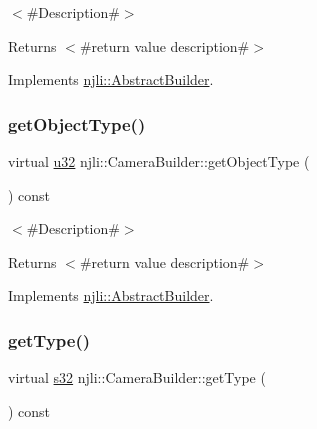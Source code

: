 $<$\#\+Description\#$>$

\begin{DoxyReturn}{Returns}
$<$\#return value description\#$>$ 
\end{DoxyReturn}


Implements \mbox{\hyperlink{classnjli_1_1_abstract_builder_a902f73ea78031b06aca183a417f3413b}{njli\+::\+Abstract\+Builder}}.

\mbox{\label{classnjli_1_1_camera_builder_a062d43db7288f55f60543b00c4f6a0ea}} 
\subsubsection{\texorpdfstring{get\+Object\+Type()}{getObjectType()}}
{\footnotesize\ttfamily virtual \mbox{\hyperlink{_util_8h_a10e94b422ef0c20dcdec20d31a1f5049}{u32}} njli\+::\+Camera\+Builder\+::get\+Object\+Type (\begin{DoxyParamCaption}{ }\end{DoxyParamCaption}) const\hspace{0.3cm}{\ttfamily [virtual]}}

$<$\#\+Description\#$>$

\begin{DoxyReturn}{Returns}
$<$\#return value description\#$>$ 
\end{DoxyReturn}


Implements \mbox{\hyperlink{classnjli_1_1_abstract_builder_a0f2d344fcf697b167f4f2b1122b5fb33}{njli\+::\+Abstract\+Builder}}.

\mbox{\label{classnjli_1_1_camera_builder_a279d8b7ec01bdb710c8e6d4683dda0c4}} 
\subsubsection{\texorpdfstring{get\+Type()}{getType()}}
{\footnotesize\ttfamily virtual \mbox{\hyperlink{_util_8h_aa62c75d314a0d1f37f79c4b73b2292e2}{s32}} njli\+::\+Camera\+Builder\+::get\+Type (\begin{DoxyParamCaption}{ }\end{DoxyParamCaption}) const\hspace{0.3cm}{\ttfamily [virtual]}}

